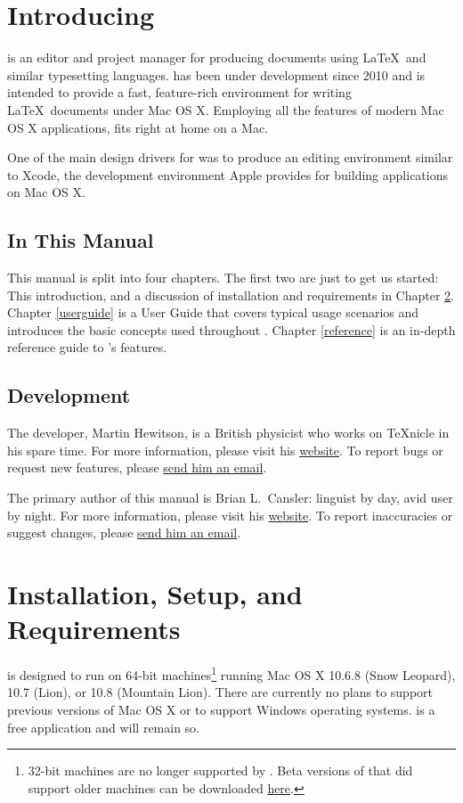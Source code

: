 \chapter{Introducing \texnicle}
\label{intro}
\texnicle is an editor and project manager for producing documents using \LaTeX\ and similar typesetting languages. \texnicle has been under development since 2010 and is intended to provide a fast, feature-rich environment for writing \LaTeX\ documents under Mac OS X. Employing all the features of modern Mac OS X applications, \texnicle fits right at home on a Mac.

One of the main design drivers for \texnicle was to produce an editing environment similar to Xcode, the development environment Apple provides for building applications on Mac OS X.

\section{In This Manual}
\label{inthismanual}
This manual is split into four chapters. The first two are just to get us started: This introduction, and a discussion of installation and requirements in Chapter \ref{requirements}. Chapter \ref{userguide} is a User Guide that covers typical usage scenarios and introduces the basic concepts used throughout \texnicle. Chapter \ref{reference} is an in-depth reference guide to \texnicle’s features.

\section{Development}
\label{dev}
The developer, Martin Hewitson, is a British physicist who works on TeXnicle in his spare time. For more information, please visit his \href{http://bobsoft-mac.de}{website}. To report bugs or request new features, please \href{mailto:martin@bobsoft-mac.de}{send him an email}.

The primary author of this manual is Brian L.\ Cansler: linguist by day, avid \texnicle user by night. For more information, please visit his \href{http://unc.edu/~bcansler}{website}. To report inaccuracies or suggest changes, please \href{mailto:bcansler@me.com}{send him an email}.

\chapter{Installation, Setup, and Requirements}
\label{requirements}
\texnicle is designed to run on 64-bit machines\footnote{32-bit machines are no longer supported by \texnicle. Beta versions of \texnicle that did support older machines can be downloaded \href{http://bobsoft-mac.de}{here}.} running Mac OS X 10.6.8 (Snow Leopard), 10.7 (Lion), or 10.8 (Mountain Lion). There are currently no plans to support previous versions of Mac OS X or to support Windows operating systems. \texnicle is a free application and will remain so.

